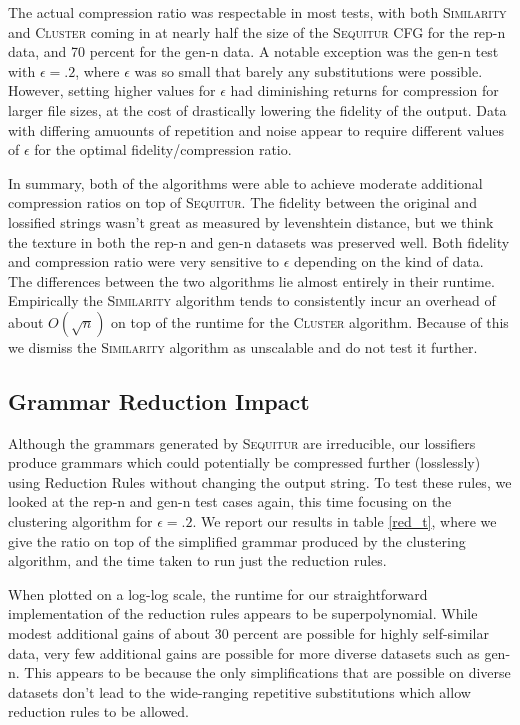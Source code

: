 \documentclass[11pt]{article}
\newcommand{\Sequitur}{\textsc{Sequitur}\xspace}
\newcommand{\Similarity}{\textsc{Similarity}\xspace}
\newcommand{\Cluster}{\textsc{Cluster}\xspace}
\begin{document}
The actual compression ratio was respectable in most tests, with both \Similarity and \Cluster
coming in at nearly half the size of the \Sequitur CFG for the rep-n data,
and 70 percent for the gen-n data. A notable exception was
the gen-n test with $\epsilon=.2$, where $\epsilon$ was so small that barely
any substitutions were possible. 
However, setting higher values
for $\epsilon$ had diminishing returns for compression for larger
file sizes, at the cost of drastically lowering the fidelity of the output.
Data with differing amuounts of repetition and noise
appear to require different values of $\epsilon$ for the optimal fidelity/compression ratio.

In summary, both of the algorithms were able to achieve moderate additional compression ratios
on top of \Sequitur. The fidelity between the original and lossified strings
wasn't great as measured by levenshtein distance, but we think the texture in both the
rep-n and gen-n datasets was preserved well. Both fidelity and compression ratio were
very sensitive to $\epsilon$ depending on the kind of data.
The differences between the two algorithms lie almost entirely in their
runtime. Empirically the \Similarity algorithm tends to
consistently incur an overhead of about $O(\sqrt{n})$ on top of the runtime for
the \Cluster algorithm. Because of this we dismiss the \Similarity algorithm as
unscalable and do not test it further.

\subsection{Grammar Reduction Impact}

Although the grammars generated by \Sequitur are irreducible, our lossifiers
produce grammars which could potentially be compressed further (losslessly)
using Reduction Rules without changing the output string. To test these rules, 
we looked at the rep-n and gen-n
test cases again, this time focusing on the clustering algorithm for $\epsilon
= .2$. We report our results in table \ref{red_t}, where
we give the ratio on top of the simplified grammar produced by
the clustering algorithm, and the time taken to run just the reduction rules.

When plotted on a log-log scale, the runtime for our straightforward
implementation of the reduction rules appears to be superpolynomial. While
modest additional gains of about 30 percent are possible for highly
self-similar data, very few additional gains are possible for more diverse
datasets such as gen-n. This appears to be because the only simplifications
that are possible on diverse datasets don't lead to the wide-ranging repetitive
substitutions which allow reduction rules to be allowed.  
\end{document}
